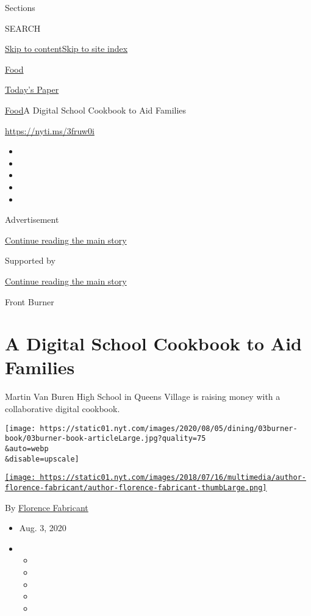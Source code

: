Sections

SEARCH

\protect\hyperlink{site-content}{Skip to
content}\protect\hyperlink{site-index}{Skip to site index}

\href{https://www.nytimes.com/section/food}{Food}

\href{https://myaccount.nytimes.com/auth/login?response_type=cookie\&client_id=vi}{}

\href{https://www.nytimes.com/section/todayspaper}{Today's Paper}

\href{/section/food}{Food}\textbar{}A Digital School Cookbook to Aid
Families

\url{https://nyti.ms/3fruw0i}

\begin{itemize}
\item
\item
\item
\item
\item
\end{itemize}

Advertisement

\protect\hyperlink{after-top}{Continue reading the main story}

Supported by

\protect\hyperlink{after-sponsor}{Continue reading the main story}

Front Burner

\hypertarget{a-digital-school-cookbook-to-aid-families}{%
\section{A Digital School Cookbook to Aid
Families}\label{a-digital-school-cookbook-to-aid-families}}

Martin Van Buren High School in Queens Village is raising money with a
collaborative digital cookbook.

\texttt{[image: https://static01.nyt.com/images/2020/08/05/dining/03burner-book/03burner-book-articleLarge.jpg?quality=75\\\&auto=webp\\\&disable=upscale]}

\href{https://www.nytimes.com/by/florence-fabricant}{\texttt{[image: https://static01.nyt.com/images/2018/07/16/multimedia/author-florence-fabricant/author-florence-fabricant-thumbLarge.png]}}

By \href{https://www.nytimes.com/by/florence-fabricant}{Florence
Fabricant}

\begin{itemize}
\item
  Aug. 3, 2020
\item
  \begin{itemize}
  \item
  \item
  \item
  \item
  \item
  \end{itemize}
\end{itemize}


